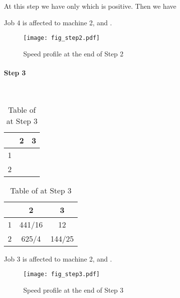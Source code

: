 \documentclass[11pt,a4paper]{article}
\begin{document}
At this step we have only  which is positive.
Then we have 




Job 4 is affected to machine 2,  and .

\begin{figure}[H]
\begin{center}
\texttt{[image: fig\_step2.pdf]} 
\end{center}
\caption{Speed profile  at the end of Step 2}
\label{speed_profile_step2}
\end{figure}



\paragraph{Step 3}

\\

\begin{table}[H]
\centering
\begin{tabular}{|c|c|c|}
\hline 
  & 2 & 3  \\ 
\hline 
1  &  &   \\ 
\hline 
2 &  &   \\ 
\hline 
\end{tabular} 
\caption{Table of  at Step 3}
\end{table}


\begin{table}[H]
\centering
\begin{tabular}{|c|c|c|}
\hline 
 & 2 & 3 \\ 
\hline 
1 & 441/16 & 12  \\ 
\hline 
2  & 625/4 & 144/25 \\ 
\hline 
\end{tabular} 
\caption{Table of  at Step 3}
\end{table}






Job 3 is affected to machine 2,  and .


\begin{figure}[H]
\begin{center}
\texttt{[image: fig\_step3.pdf]} 
\end{center}
\caption{Speed profile  at the end of Step 3}
\label{speed_profile_step3}
\end{figure}
\end{document}
